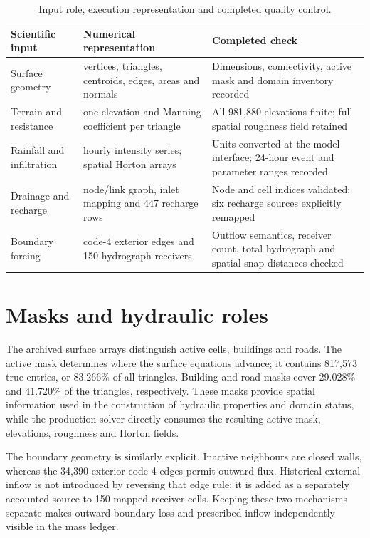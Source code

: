 \documentclass[11pt,a4paper,oneside]{report}
\begin{document}
\begin{table}[H]
\centering
\caption[Scientific input traceability.]{Input role, execution representation and completed
quality control.}
\label{tab:inputtrace}
\footnotesize
\begin{tabularx}{\textwidth}{|p{}|p{}|X|}
\hline
\textbf{Scientific input} & \textbf{Numerical representation} & \textbf{Completed check} \\
\hline\hline
Surface geometry & vertices, triangles, centroids, edges, areas and normals & Dimensions,
connectivity, active mask and domain inventory recorded \\ \hdashline[0.4pt/1.2pt]
Terrain and resistance & one elevation and Manning coefficient per triangle & All 981,880
elevations finite; full spatial roughness field retained \\ \hdashline[0.4pt/1.2pt]
Rainfall and infiltration & hourly intensity series; spatial Horton arrays & Units converted
at the model interface; 24-hour event and parameter ranges recorded \\ \hdashline[0.4pt/1.2pt]
Drainage and recharge & node/link graph, inlet mapping and 447 recharge rows & Node and cell
indices validated; six recharge sources explicitly remapped \\ \hdashline[0.4pt/1.2pt]
Boundary forcing & code-4 exterior edges and 150 hydrograph receivers & Outflow semantics,
receiver count, total hydrograph and spatial snap distances checked \\
\hline
\end{tabularx}
\end{table}

\section{Masks and hydraulic roles}

The archived surface arrays distinguish active cells, buildings and roads. The active mask
determines where the surface equations advance; it contains 817,573 true entries, or 83.266\%
of all triangles. Building and road masks cover 29.028\% and 41.720\% of the triangles,
respectively. These masks provide spatial information used in the construction of hydraulic
properties and domain status, while the production solver directly consumes the resulting
active mask, elevations, roughness and Horton fields.

The boundary geometry is similarly explicit. Inactive neighbours are closed walls, whereas the
34,390 exterior code-4 edges permit outward flux. Historical external inflow is not introduced
by reversing that edge rule; it is added as a separately accounted source to 150 mapped receiver
cells. Keeping these two mechanisms separate makes outward boundary loss and prescribed inflow
independently visible in the mass ledger.
\end{document}
